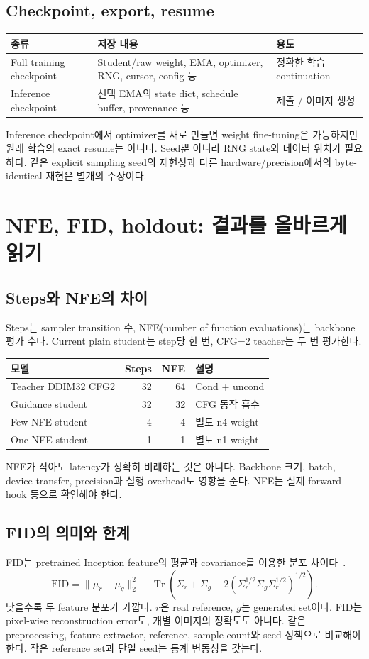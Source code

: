\documentclass[11pt,a4paper]{article}
\begin{document}
\subsection{Checkpoint, export, resume}
\par\noindent
\begin{tabularx}{\linewidth}{lYY}
\toprule 종류 & 저장 내용 & 용도 \\\midrule
Full training checkpoint & Student/raw weight, EMA, optimizer, RNG, cursor, config 등 & 정확한 학습 continuation \\
Inference checkpoint & 선택 EMA의 state dict, schedule buffer, provenance 등 & 제출 / 이미지 생성 \\
\bottomrule
\end{tabularx}
\par
Inference checkpoint에서 optimizer를 새로 만들면 weight fine-tuning은 가능하지만 원래 학습의 exact resume는 아니다. Seed뿐 아니라 RNG state와 데이터 위치가 필요하다. 같은 explicit sampling seed의 재현성과 다른 hardware/precision에서의 byte-identical 재현은 별개의 주장이다.

\section{NFE, FID, holdout: 결과를 올바르게 읽기}
\subsection{Steps와 NFE의 차이}
Steps는 sampler transition 수, NFE(number of function evaluations)는 backbone 평가 수다. Current plain student는 step당 한 번, CFG=2 teacher는 두 번 평가한다.
\par\noindent
\begin{tabularx}{\linewidth}{lrrY}
\toprule 모델 & Steps & NFE & 설명 \\\midrule
Teacher DDIM32 CFG2 & 32 & 64 & Cond + uncond \\
Guidance student & 32 & 32 & CFG 동작 흡수 \\
Few-NFE student & 4 & 4 & 별도 n4 weight \\
One-NFE student & 1 & 1 & 별도 n1 weight \\
\bottomrule
\end{tabularx}
\par
NFE가 작아도 latency가 정확히 비례하는 것은 아니다. Backbone 크기, batch, device transfer, precision과 실행 overhead도 영향을 준다. NFE는 실제 forward hook 등으로 확인해야 한다.

\subsection{FID의 의미와 한계}
FID는 pretrained Inception feature의 평균과 covariance를 이용한 분포 차이다~\cite{fid}.
\[
\mathrm{FID}=\|\mu_r-\mu_g\|_2^2+
\operatorname{Tr}\!\left(\Sigma_r+\Sigma_g-2(\Sigma_r^{1/2}\Sigma_g\Sigma_r^{1/2})^{1/2}\right).
\]
낮을수록 두 feature 분포가 가깝다. $r$은 real reference, $g$는 generated set이다. FID는 pixel-wise reconstruction error도, 개별 이미지의 정확도도 아니다. 같은 preprocessing, feature extractor, reference, sample count와 seed 정책으로 비교해야 한다. 작은 reference set과 단일 seed는 통계 변동성을 갖는다.
\end{document}

